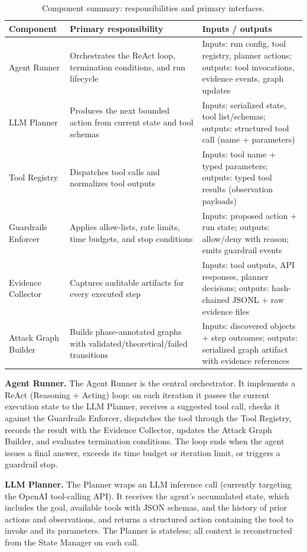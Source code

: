 \documentclass[conference]{IEEEtran}
\begin{document}
\begin{table}[t!]
\centering
\caption{Component summary: responsibilities and primary interfaces.}
\label{tab:components}
\scriptsize
\setlength{\tabcolsep}{6pt}
\renewcommand{\arraystretch}{1.2}
\begin{tabularx}{\textwidth}{l X X}
\toprule
\textbf{Component} & \textbf{Primary responsibility} & \textbf{Inputs / outputs} \\
\midrule
Agent Runner & Orchestrates the ReAct loop, termination conditions, and run lifecycle & Inputs: run config, tool registry, planner actions; outputs: tool invocations, evidence events, graph updates \\
LLM Planner & Produces the next bounded action from current state and tool schemas & Inputs: serialized state, tool list/schemas; outputs: structured tool call (name + parameters) \\
Tool Registry & Dispatches tool calls and normalizes tool outputs & Inputs: tool name + typed parameters; outputs: typed tool results (observation payloads) \\
Guardrails Enforcer & Applies allow-lists, rate limits, time budgets, and stop conditions & Inputs: proposed action + run state; outputs: allow/deny with reason; emits guardrail events \\
Evidence Collector & Captures auditable artifacts for every executed step & Inputs: tool outputs, API responses, planner decisions; outputs: hash-chained JSONL + raw evidence files \\
Attack Graph Builder & Builds phase-annotated graphs with validated/theoretical/failed transitions & Inputs: discovered objects + step outcomes; outputs: serialized graph artifact with evidence references \\
\bottomrule
\end{tabularx}
\end{table}

\textbf{Agent Runner.}
The Agent Runner is the central orchestrator. It implements a ReAct (Reasoning + Acting) loop: on each iteration it passes the current execution state to the LLM Planner, receives a suggested tool call, checks it against the Guardrails Enforcer, dispatches the tool through the Tool Registry, records the result with the Evidence Collector, updates the Attack Graph Builder, and evaluates termination conditions. The loop ends when the agent issues a final answer, exceeds its time budget or iteration limit, or triggers a guardrail stop.

\textbf{LLM Planner.}
The Planner wraps an LLM inference call (currently targeting the OpenAI tool-calling API). It receives the agent's accumulated state, which includes the goal, available tools with JSON schemas, and the history of prior actions and observations, and returns a structured action containing the tool to invoke and its parameters. The Planner is stateless; all context is reconstructed from the State Manager on each call.
\end{document}
